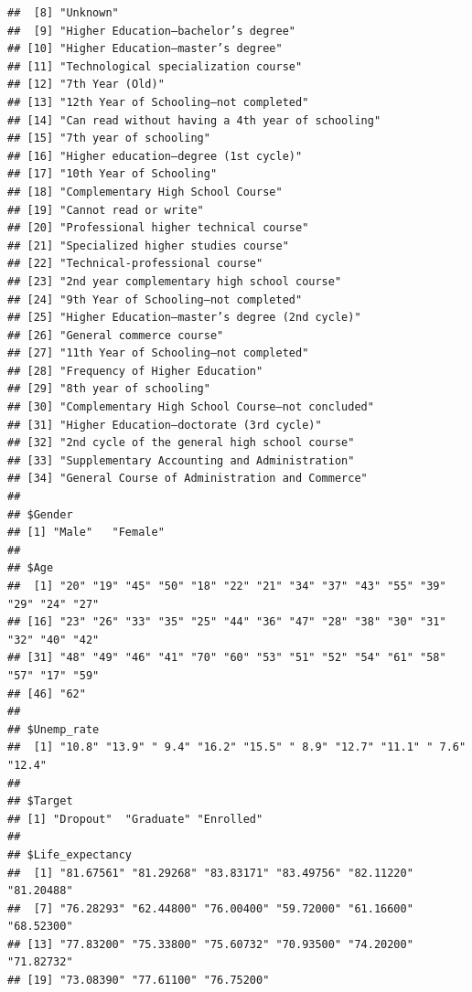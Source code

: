 \documentclass[
]{article}
\begin{document}
\begin{verbatim}
##  [8] "Unknown"                                                     
##  [9] "Higher Education—bachelor’s degree"                          
## [10] "Higher Education—master’s degree"                            
## [11] "Technological specialization course"                         
## [12] "7th Year (Old)"                                              
## [13] "12th Year of Schooling—not completed"                        
## [14] "Can read without having a 4th year of schooling"             
## [15] "7th year of schooling"                                       
## [16] "Higher education—degree (1st cycle)"                         
## [17] "10th Year of Schooling"                                      
## [18] "Complementary High School Course"                            
## [19] "Cannot read or write"                                        
## [20] "Professional higher technical course"                        
## [21] "Specialized higher studies course"                           
## [22] "Technical-professional course"                               
## [23] "2nd year complementary high school course"                   
## [24] "9th Year of Schooling—not completed"                         
## [25] "Higher Education—master’s degree (2nd cycle)"                
## [26] "General commerce course"                                     
## [27] "11th Year of Schooling—not completed"                        
## [28] "Frequency of Higher Education"                               
## [29] "8th year of schooling"                                       
## [30] "Complementary High School Course—not concluded"              
## [31] "Higher Education—doctorate (3rd cycle)"                      
## [32] "2nd cycle of the general high school course"                 
## [33] "Supplementary Accounting and Administration"                 
## [34] "General Course of Administration and Commerce"               
## 
## $Gender
## [1] "Male"   "Female"
## 
## $Age
##  [1] "20" "19" "45" "50" "18" "22" "21" "34" "37" "43" "55" "39" "29" "24" "27"
## [16] "23" "26" "33" "35" "25" "44" "36" "47" "28" "38" "30" "31" "32" "40" "42"
## [31] "48" "49" "46" "41" "70" "60" "53" "51" "52" "54" "61" "58" "57" "17" "59"
## [46] "62"
## 
## $Unemp_rate
##  [1] "10.8" "13.9" " 9.4" "16.2" "15.5" " 8.9" "12.7" "11.1" " 7.6" "12.4"
## 
## $Target
## [1] "Dropout"  "Graduate" "Enrolled"
## 
## $Life_expectancy
##  [1] "81.67561" "81.29268" "83.83171" "83.49756" "82.11220" "81.20488"
##  [7] "76.28293" "62.44800" "76.00400" "59.72000" "61.16600" "68.52300"
## [13] "77.83200" "75.33800" "75.60732" "70.93500" "74.20200" "71.82732"
## [19] "73.08390" "77.61100" "76.75200"
\end{verbatim}
\end{document}
